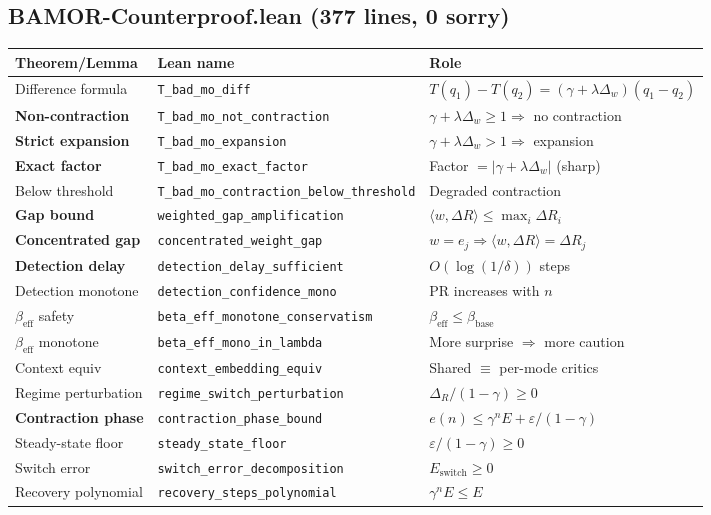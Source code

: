 \medskip

\subsection{BAMOR-Counterproof.lean (377 lines, \textbf{0 sorry})}
\begin{center}
\scriptsize
\begin{adjustbox}{max width=\textwidth}
\begin{tabular}{lll}
\toprule
\textbf{Theorem/Lemma} & \textbf{Lean name} & \textbf{Role} \\
\midrule
Difference formula & \texttt{T\_bad\_mo\_diff} & $T(q_1) - T(q_2) = (\gamma+\lambda\Delta_w)(q_1-q_2)$ \\
\textbf{Non-contraction} & \texttt{T\_bad\_mo\_not\_contraction} & $\gamma+\lambda\Delta_w \ge 1 \Rightarrow$ no contraction \\
\textbf{Strict expansion} & \texttt{T\_bad\_mo\_expansion} & $\gamma+\lambda\Delta_w > 1 \Rightarrow$ expansion \\
\textbf{Exact factor} & \texttt{T\_bad\_mo\_exact\_factor} & Factor $= |\gamma+\lambda\Delta_w|$ (sharp) \\
Below threshold & \texttt{T\_bad\_mo\_contraction\_below\_threshold} & Degraded contraction \\
\textbf{Gap bound} & \texttt{weighted\_gap\_amplification} & $\langle w, \Delta R \rangle \le \max_i \Delta R_i$ \\
\textbf{Concentrated gap} & \texttt{concentrated\_weight\_gap} & $w = e_j \Rightarrow \langle w, \Delta R \rangle = \Delta R_j$ \\
\midrule
\textbf{Detection delay} & \texttt{detection\_delay\_sufficient} & $O(\log(1/\delta))$ steps \\
Detection monotone & \texttt{detection\_confidence\_mono} & PR increases with $n$ \\
\midrule
$\beta_{\mathrm{eff}}$ safety & \texttt{beta\_eff\_monotone\_conservatism} & $\beta_{\mathrm{eff}} \le \beta_{\mathrm{base}}$ \\
$\beta_{\mathrm{eff}}$ monotone & \texttt{beta\_eff\_mono\_in\_lambda} & More surprise $\Rightarrow$ more caution \\
\midrule
Context equiv & \texttt{context\_embedding\_equiv} & Shared $\equiv$ per-mode critics \\
\midrule
Regime perturbation & \texttt{regime\_switch\_perturbation} & $\Delta_R/(1{-}\gamma) \ge 0$ \\
\textbf{Contraction phase} & \texttt{contraction\_phase\_bound} & $e(n) \le \gamma^n E + \varepsilon/(1{-}\gamma)$ \\
Steady-state floor & \texttt{steady\_state\_floor} & $\varepsilon/(1{-}\gamma) \ge 0$ \\
Switch error & \texttt{switch\_error\_decomposition} & $E_{\mathrm{switch}} \ge 0$ \\
Recovery polynomial & \texttt{recovery\_steps\_polynomial} & $\gamma^n E \le E$ \\
\bottomrule
\end{tabular}
\end{adjustbox}
\end{center}

